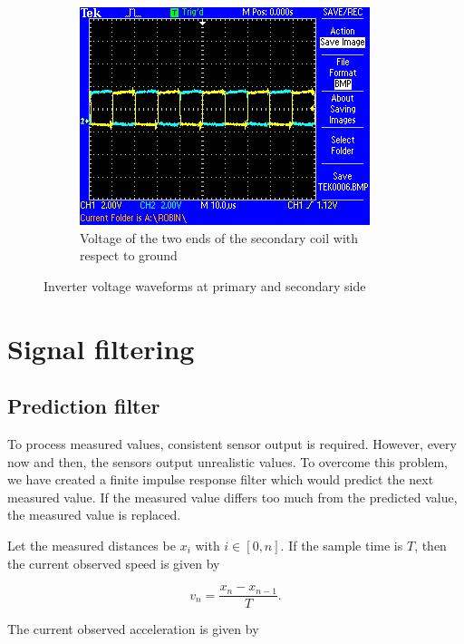 \documentclass[11pt,titlepage]{report}
\begin{document}
\begin{appendices}
\begin{figure}[H]
\begin{center}
\begin{subfigure}[h]{0.48\textwidth}
			\includegraphics[width=\textwidth]{resource/osc-coil-secondary.png}
			\caption{Voltage of the two ends of the secondary coil with respect to ground}
			\label{fig:app-osc-coil-secondary}
		\end{subfigure}
	\end{center}
	\caption{Inverter voltage waveforms at primary and secondary side}
\end{figure}




\chapter{Signal filtering}
\label{app:signal-filtering}
\section{Prediction filter}
To process measured values, consistent sensor output is required. However, every now and then, the sensors output unrealistic values. To overcome this problem, we have created a finite impulse response filter which would predict the next measured value. If the measured value differs too much from the predicted value, the measured value is replaced.

Let the measured distances be $x_i$ with $i \in [0,n]$. If the sample time is $T$, then the current observed speed is given by

\begin{equation}
	v_n = \frac{x_{n} - x_{n-1}}{T}.
\end{equation}

The current observed acceleration is given by


\end{appendices}
\end{document}

